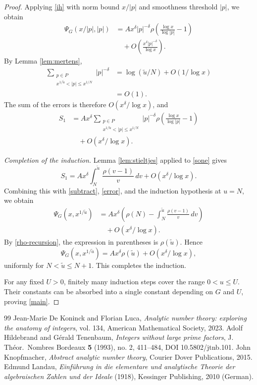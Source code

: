 \documentclass[10pt,a4paper]{amsart}
\begin{document}
\begin{proof}
Applying \eqref{ih} with norm bound $x/|p|$ and
smoothness threshold $|p|$, we obtain
\begin{align*}
\Psi_G(x/|p|,|p|)
&=
Ax^\delta|p|^{-\delta}
\rho\!\left(\frac{\log x}{\log|p|}-1\right)\\
&\quad+
O\!\left(
\frac{x^\delta|p|^{-\delta}}{\log x}
\right).
\end{align*}
By Lemma \ref{lem:mertens},
\begin{align*}
\sum_{\substack{p\in P\\
x^{1/\tilde u}<|p|\le x^{1/N}}}|p|^{-\delta}
&=
\log(\tilde u/N)+O(1/\log x)\\
&=O(1).
\end{align*}
The sum of the errors is therefore
$O(x^\delta/\log x)$, and
\begin{equation}\label{sone}
\begin{split}
S_1
&=
Ax^\delta
\sum_{\substack{p\in P\\
x^{1/\tilde u}<|p|\le x^{1/N}}}
|p|^{-\delta}
\rho\!\left(\frac{\log x}{\log|p|}-1\right)\\
&\quad+O(x^\delta/\log x).
\end{split}
\end{equation}

\smallskip
\noindent\emph{Completion of the induction.}
Lemma \ref{lem:stieltjes} applied to \eqref{sone} gives
\[
S_1
=
Ax^\delta
\int_N^{\tilde u}\frac{\rho(v-1)}v\,dv
+O(x^\delta/\log x).
\]
Combining this with \eqref{subtract}, \eqref{error},
and the induction hypothesis at $u=N$, we obtain
\begin{align*}
\Psi_G(x,x^{1/\tilde u})
&=
Ax^\delta
\left(
\rho(N)-\int_N^{\tilde u}\frac{\rho(v-1)}v\,dv
\right)\\
&\quad+O(x^\delta/\log x).
\end{align*}
By \eqref{rho-recursion}, the expression in parentheses
is $\rho(\tilde u)$. Hence
\[
\Psi_G(x,x^{1/\tilde u})
=
Ax^\delta\rho(\tilde u)
+O(x^\delta/\log x),
\]
uniformly for $N<\tilde u\le N+1$.
This completes the induction.

For any fixed $U>0$, finitely many induction steps cover the range
$0<u\le U$. Their constants can be absorbed into a single
constant depending on $G$ and $U$, proving \eqref{main}.
\end{proof}

\begin{thebibliography}{99}
 Jean-Marie De Koninck and Florian Luca, \emph{Analytic number theory: exploring the anatomy of integers}, vol. 134, American Mathematical Society, 2023.
 Adolf Hildebrand and G\'erald Tenenbaum, \emph{Integers without large prime factors}, J. Th\'eor.\ Nombres Bordeaux \textbf{5} (1993), no. 2, 411--484, DOI 10.5802/jtnb.101.
 John Knopfmacher, \emph{Abstract analytic number theory}, Courier Dover Publications, 2015.
 Edmund Landau, \emph{Einf\"uhrung in die elementare und analytische Theorie der algebraischen Zahlen und der Ideale} (1918), Kessinger Publishing, 2010 (German).
\end{thebibliography}
\end{document}
